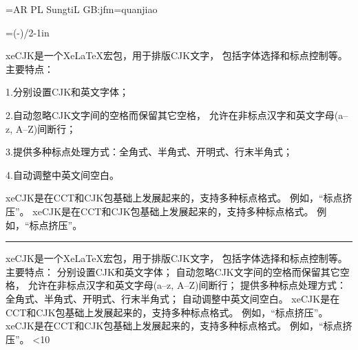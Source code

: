 

\jfont\tensong={AR PL SungtiL GB:jfm=quanjiao}
\rm\tensong

\zw
\parskip=0pt
\pdfpagewidth=210mm
\pdfpageheight=297mm
\zw
\hoffset=\dimexpr(\pdfpagewidth-\hsize)/2-1in\relax
\vsize=246mm

xeCJK是一个XeLaTeX宏包，用于排版CJK文字，
包括字体选择和标点控制等。主要特点：

\par\medskip
\item{1.}分别设置CJK和英文字体；
\item{2.}自动忽略CJK文字间的空格而保留其它空格，
允许在非标点汉字和英文字母(a--z, A--Z)间断行；
\item{3.}提供多种标点处理方式：全角式、半角式、开明式、行末半角式；
\item{4.}自动调整中英文间空白。
\par\medskip

xeCJK是在CCT和CJK包基础上发展起来的，支持多种标点格式。
例如，“标点挤压”。
xeCJK是在CCT和CJK包基础上发展起来的，支持多种标点格式。
例如，“标点挤压”。
\par\bigskip

\hrule\bigskip

\newcount\tcount
{} \loop
xeCJK是一个XeLaTeX宏包，用于排版CJK文字，
包括字体选择和标点控制等。主要特点：
分别设置CJK和英文字体；
自动忽略CJK文字间的空格而保留其它空格，
允许在非标点汉字和英文字母(a--z, A--Z)间断行；
提供多种标点处理方式：全角式、半角式、开明式、行末半角式；
自动调整中英文间空白。
xeCJK是在CCT和CJK包基础上发展起来的，支持多种标点格式。
例如，“标点挤压”。
xeCJK是在CCT和CJK包基础上发展起来的，支持多种标点格式。
例如，“标点挤压”。
\advance{}
\ifnum\tcount<10 \repeat

\bye
